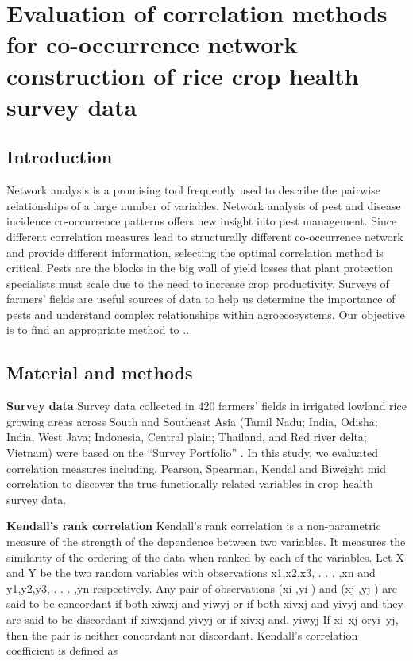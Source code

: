 \section{Evaluation of correlation methods for co-occurrence network construction of rice crop health survey data}

\subsection*{Introduction}

Network analysis is a promising tool frequently used to describe the pairwise relationships of a large number of variables. Network analysis of pest and disease incidence co-occurrence patterns offers new insight into pest management. Since different correlation measures lead to structurally different co-occurrence network and provide different information, selecting the optimal correlation method is critical. Pests are the blocks in the big wall of yield losses that plant protection specialists must scale due to the need to increase crop productivity. Surveys of farmers’ fields are useful sources of data to help us determine the importance of pests and understand complex relationships within agroecosystems. Our objective is to find an appropriate method to ..

% 

\subsection*{Material and methods}
\textbf{Survey data}
Survey data collected in 420 farmers’ fields in irrigated lowland rice growing areas across South and Southeast Asia (Tamil Nadu; India, Odisha; India, West Java; Indonesia, Central plain; Thailand, and Red river delta; Vietnam) were based on the “Survey Portfolio” . In this study, we evaluated correlation measures including, Pearson, Spearman, Kendal and Biweight mid correlation to discover the true functionally related variables in crop health survey data.

\textbf{Kendall’s rank correlation}
Kendall’s rank correlation is a non-parametric measure of the strength of the dependence between two variables. It measures the similarity of the ordering of the data when ranked by each of the variables.
Let X and Y be the two random variables with observations x1,x2,x3, . . . ,xn and y1,y2,y3, . . . ,yn respectively. Any pair of observations (xi ,yi ) and (xj ,yj ) are said to be concordant if both xiwxj and yiwyj or if both xivxj and yivyj and they are said to be discordant if xiwxjand yivyj or if xivxj and. yiwyj If xi~xj oryi~yj, then the pair is neither concordant nor discordant.
Kendall’s correlation coefficient is defined as 


